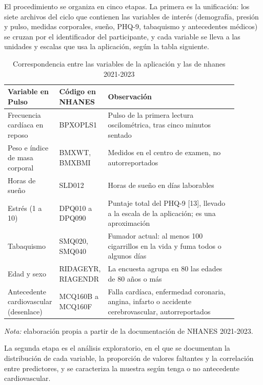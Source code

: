\documentclass[conference]{IEEEtran}
\begin{document}
El procedimiento se organiza en cinco etapas. La primera es la unificación: los siete archivos del ciclo que contienen las variables de interés (demografía, presión y pulso, medidas corporales, sueño, PHQ-9, tabaquismo y antecedentes médicos) se cruzan por el identificador del participante, y cada variable se lleva a las unidades y escalas que usa la aplicación, según la tabla siguiente.

\begin{table}[!t]
\centering
\caption{Correspondencia entre las variables de la aplicación y las de nhanes 2021-2023}
\footnotesize
\renewcommand{\arraystretch}{1.15}
\begin{tabular}{>{\raggedright\arraybackslash}p{0.191\linewidth}>{\raggedright\arraybackslash}p{0.120\linewidth}>{\raggedright\arraybackslash}p{0.579\linewidth}}
\hline
\textbf{Variable en Pulso} & \textbf{Código en NHANES} & \textbf{Observación} \\ \hline
Frecuencia cardíaca en reposo & BPXOPLS1 & Pulso de la primera lectura oscilométrica, tras cinco minutos sentado \\ \hline
Peso e índice de masa corporal & BMXWT, BMXBMI & Medidos en el centro de examen, no autorreportados \\ \hline
Horas de sueño & SLD012 & Horas de sueño en días laborables \\ \hline
Estrés (1 a 10) & DPQ010 a DPQ090 & Puntaje total del PHQ-9 [13], llevado a la escala de la aplicación; es una aproximación \\ \hline
Tabaquismo & SMQ020, SMQ040 & Fumador actual: al menos 100 cigarrillos en la vida y fuma todos o algunos días \\ \hline
Edad y sexo & RIDAGEYR, RIAGENDR & La encuesta agrupa en 80 las edades de 80 años o más \\ \hline
Antecedente cardiovascular (desenlace) & MCQ160B a MCQ160F & Falla cardíaca, enfermedad coronaria, angina, infarto o accidente cerebrovascular, autorreportados \\ \hline
\end{tabular}
\par\smallskip\parbox{\linewidth}{\scriptsize\textit{Nota:} elaboración propia a partir de la documentación de NHANES 2021-2023.}
\end{table}
La segunda etapa es el análisis exploratorio, en el que se documentan la distribución de cada variable, la proporción de valores faltantes y la correlación entre predictores, y se caracteriza la muestra según tenga o no antecedente cardiovascular.
\end{document}
